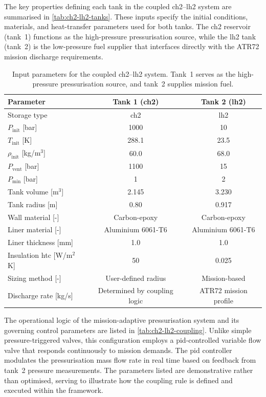 The key properties defining each tank in the coupled \gls{ch2}--\gls{lh2} system are summarised in \autoref{tab:ch2-lh2-tanks}. These inputs specify the initial conditions, materials, and heat-transfer parameters used for both tanks. The \gls{ch2} reservoir (tank~1) functions as the high-pressure pressurisation source, while the \gls{lh2} tank (tank~2) is the low-pressure fuel supplier that interfaces directly with the ATR72 mission discharge requirements.

\begin{table}[H]
\centering
\caption{Input parameters for the coupled \gls{ch2}--\gls{lh2} system. Tank~1 serves as the high-pressure pressurisation source, and tank~2 supplies mission fuel.}
\label{tab:ch2-lh2-tanks}
\begin{tabular}{@{}lcc@{}}
\toprule
\textbf{Parameter} & \textbf{Tank 1 (\gls{ch2})} & \textbf{Tank 2 (\gls{lh2})} \\ \midrule
Storage type & \gls{ch2} & \gls{lh2} \\
$P_{\text{init}}$ [bar] & 1000 & 10 \\
$T_{\text{init}}$ [K] & 288.1 & 23.5 \\
$\rho_{\text{init}}$ [kg/m$^3$] & 60.0 & 68.0 \\
$P_{\text{vent}}$ [bar] & 1100 & 15 \\
$P_{\text{min}}$ [bar] & 1 & 2 \\
Tank volume [m$^3$] & 2.145 & 3.230 \\
Tank radius [m] & 0.80 & 0.917 \\
Wall material [-] & Carbon-epoxy & Carbon-epoxy \\
Liner material [-] & Aluminium 6061-T6 & Aluminium 6061-T6 \\
Liner thickness [mm] & 1.0 & 1.0 \\
Insulation \gls{htc} [W/m$^2$K] & 50 & 0.025 \\
Sizing method [-] & User-defined radius & Mission-based \\
Discharge rate [kg/s] & Determined by coupling logic & ATR72 mission profile \\ \bottomrule
\end{tabular}
\end{table}

The operational logic of the mission-adaptive pressurisation system and its governing control parameters are listed in \autoref{tab:ch2-lh2-coupling}. Unlike simple pressure-triggered valves, this configuration employs a \gls{pid}-controlled variable flow valve that responds continuously to mission demands. The \gls{pid} controller modulates the pressurisation mass flow rate in real time based on feedback from tank~2 pressure measurements. The parameters listed are demonstrative rather than optimised, serving to illustrate how the coupling rule is defined and executed within the framework.

